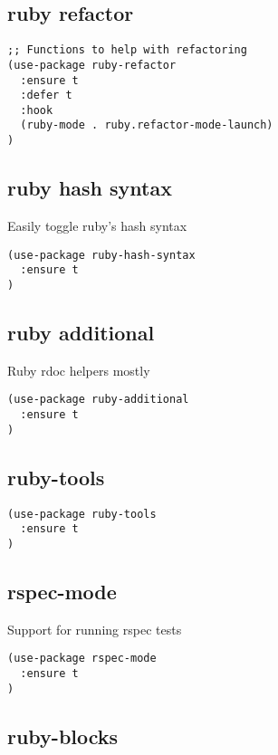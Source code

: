 \documentclass[11pt]{article}
\begin{document}
\subsection*{ruby refactor}
\label{sec:org58a278a}
\begin{verbatim}
;; Functions to help with refactoring
(use-package ruby-refactor
  :ensure t
  :defer t
  :hook
  (ruby-mode . ruby.refactor-mode-launch)
)
\end{verbatim}

\subsection*{ruby hash syntax}
\label{sec:org6dc07fc}

Easily toggle ruby's hash syntax

\begin{verbatim}
(use-package ruby-hash-syntax
  :ensure t
)
\end{verbatim}

\subsection*{ruby additional}
\label{sec:org52aa48e}

Ruby rdoc helpers mostly

\begin{verbatim}
(use-package ruby-additional
  :ensure t
)
\end{verbatim}

\subsection*{ruby-tools}
\label{sec:org1c738f9}

\begin{verbatim}
(use-package ruby-tools
  :ensure t
)
\end{verbatim}

\subsection*{rspec-mode}
\label{sec:org8aafbe8}

Support for running rspec tests

\begin{verbatim}
(use-package rspec-mode
  :ensure t
)
\end{verbatim}

\subsection*{ruby-blocks}
\label{sec:org8824daf}
\end{document}
